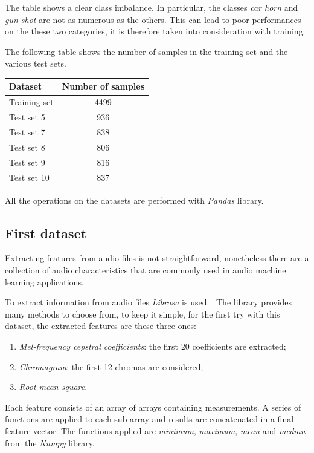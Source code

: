 The table shows a clear class imbalance. In particular, the classes 
\emph{car horn} and \emph{gun shot} are not as numerous as the others. 
This can lead to poor performances on the these two categories, it is
therefore taken 
into consideration with training. 

The following table shows the number of samples in the training set and 
the various test sets.

\begin{center}
    \begin{tabular}{ |l|c| } 
        \hline
        Dataset & Number of samples \\
        \hline
        Training set & 4499 \\
        Test set 5 & 936 \\
        Test set 7 & 838 \\
        Test set 8 & 806 \\
        Test set 9 & 816 \\
        Test set 10 & 837 \\
        \hline
    \end{tabular}
\end{center}
All the operations on the datasets are performed with \emph{Pandas} library.~\cite{pandas}

\subsection{First dataset}
\label{first}
Extracting features from audio files is not straightforward, nonetheless there 
are a collection of audio characteristics that are commonly used in audio machine learning 
applications.~\cite{features}

To extract information from audio files \emph{Librosa} is used.~\cite{librosa}
The library provides many methods to choose from,
to keep it simple, for the first try with this dataset, the extracted features 
are these three ones: 
\begin{enumerate}
    \item \emph{Mel-frequency cepstral coefficients}: the first 20 coefficients 
    are extracted;
    \item \emph{Chromagram}: the first 12 chromas are considered;
    \item \emph{Root-mean-square}.
\end{enumerate}
Each feature consists of an array of arrays containing measurements. 
A series of functions are applied to each sub-array and results 
are concatenated in a final feature vector. 
The functions applied are \emph{minimum}, \emph{maximum}, \emph{mean} 
and \emph{median} from the \emph{Numpy} library.~\cite{numpy}

